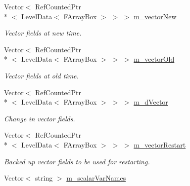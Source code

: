 \begin{DoxyCompactItemize}
\item 
\hypertarget{class_a_m_r_level_mushy_layer_a3532d7906fe5e9bbdb42e6b861bd6f32}{Vector$<$ Ref\-Counted\-Ptr\\*
$<$ Level\-Data$<$ F\-Array\-Box $>$ $>$ $>$ \hyperlink{class_a_m_r_level_mushy_layer_a3532d7906fe5e9bbdb42e6b861bd6f32}{m\-\_\-vector\-New}}\label{class_a_m_r_level_mushy_layer_a3532d7906fe5e9bbdb42e6b861bd6f32}

\begin{DoxyCompactList}\small\item\em Vector fields at new time. \end{DoxyCompactList}\item 
\hypertarget{class_a_m_r_level_mushy_layer_a3462ba31ff9fc2ea54892d9f0c9ee88b}{Vector$<$ Ref\-Counted\-Ptr\\*
$<$ Level\-Data$<$ F\-Array\-Box $>$ $>$ $>$ \hyperlink{class_a_m_r_level_mushy_layer_a3462ba31ff9fc2ea54892d9f0c9ee88b}{m\-\_\-vector\-Old}}\label{class_a_m_r_level_mushy_layer_a3462ba31ff9fc2ea54892d9f0c9ee88b}

\begin{DoxyCompactList}\small\item\em Vector fields at old time. \end{DoxyCompactList}\item 
\hypertarget{class_a_m_r_level_mushy_layer_ae0b04f00d4e2178d4c5c4ab41f735a4b}{Vector$<$ Ref\-Counted\-Ptr\\*
$<$ Level\-Data$<$ F\-Array\-Box $>$ $>$ $>$ \hyperlink{class_a_m_r_level_mushy_layer_ae0b04f00d4e2178d4c5c4ab41f735a4b}{m\-\_\-d\-Vector}}\label{class_a_m_r_level_mushy_layer_ae0b04f00d4e2178d4c5c4ab41f735a4b}

\begin{DoxyCompactList}\small\item\em Change in vector fields. \end{DoxyCompactList}\item 
\hypertarget{class_a_m_r_level_mushy_layer_a728c07f2d1ab13e5e30f511f579786d1}{Vector$<$ Ref\-Counted\-Ptr\\*
$<$ Level\-Data$<$ F\-Array\-Box $>$ $>$ $>$ \hyperlink{class_a_m_r_level_mushy_layer_a728c07f2d1ab13e5e30f511f579786d1}{m\-\_\-vector\-Restart}}\label{class_a_m_r_level_mushy_layer_a728c07f2d1ab13e5e30f511f579786d1}

\begin{DoxyCompactList}\small\item\em Backed up vector fields to be used for restarting. \end{DoxyCompactList}\item 
\hypertarget{class_a_m_r_level_mushy_layer_ade5e5c646cf12ebaacd01f0a3ba137d9}{Vector$<$ string $>$ \hyperlink{class_a_m_r_level_mushy_layer_ade5e5c646cf12ebaacd01f0a3ba137d9}{m\-\_\-scalar\-Var\-Names}}\label{class_a_m_r_level_mushy_layer_ade5e5c646cf12ebaacd01f0a3ba137d9}


\end{DoxyCompactItemize}
